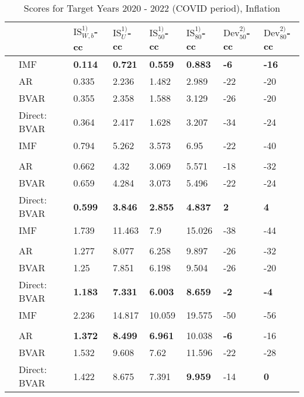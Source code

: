 \begin{table}[!h]
\centering
\caption{Scores for Target Years 2020 - 2022 (COVID period), Inflation}
\centering
\begin{tabular}[t]{llllllll}
\toprule
 &  & $\text{IS}_{W,b}^{1)}$-cc & $\text{IS}_{U}^{1)}$-cc & $\text{IS}_{50}^{1)}$-cc & $\text{IS}_{80}^{1)}$-cc & $\text{Dev}_{50}^{2)}$-cc & $\text{Dev}_{80}^{2)}$-cc\\
\midrule
 & IMF & \textbf{0.114} & \textbf{0.721} & \textbf{0.559} & \textbf{0.883} & \textbf{-6} & \textbf{-16}\\
\parbox[t]{2mm}{}
 & AR & 0.335 & 2.236 & 1.482 & 2.989 & -22 & -20\\
 & BVAR & 0.355 & 2.358 & 1.588 & 3.129 & -26 & -20\\
 & Direct: BVAR & 0.364 & 2.417 & 1.628 & 3.207 & -34 & -24\\
\addlinespace
 & IMF & 0.794 & 5.262 & 3.573 & 6.95 & -22 & -40\\
\parbox[t]{2mm}{}\\
 & AR & 0.662 & 4.32 & 3.069 & 5.571 & -18 & -32\\
 & BVAR & 0.659 & 4.284 & 3.073 & 5.496 & -22 & -24\\
 & Direct: BVAR & \textbf{0.599} & \textbf{3.846} & \textbf{2.855} & \textbf{4.837} & \textbf{2} & \textbf{4}\\
\addlinespace
 & IMF & 1.739 & 11.463 & 7.9 & 15.026 & -38 & -44\\
\parbox[t]{2mm}{}\\
 & AR & 1.277 & 8.077 & 6.258 & 9.897 & -26 & -32\\
 & BVAR & 1.25 & 7.851 & 6.198 & 9.504 & -26 & -20\\
 & Direct: BVAR & \textbf{1.183} & \textbf{7.331} & \textbf{6.003} & \textbf{8.659} & \textbf{-2} & \textbf{-4}\\
\addlinespace
 & IMF & 2.236 & 14.817 & 10.059 & 19.575 & -50 & -56\\
\parbox[t]{2mm}{}\\
 & AR & \textbf{1.372} & \textbf{8.499} & \textbf{6.961} & 10.038 & \textbf{-6} & -16\\
 & BVAR & 1.532 & 9.608 & 7.62 & 11.596 & -22 & -28\\
 & Direct: BVAR & 1.422 & 8.675 & 7.391 & \textbf{9.959} & -14 & \textbf{0}\\
\bottomrule
\end{tabular}
\end{table}
